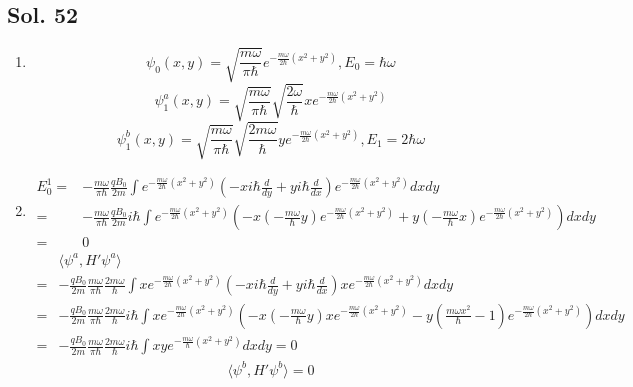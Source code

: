 \subsection*{Sol. 52}
\begin{enumerate}
    \item 
    $$
    \psi_0(x,y)=\sqrt{\frac{m\omega}{\pi\hbar}}e^{-\frac{m\omega}{2\hbar}(x^2+y^2)}, E_0 = \hbar\omega
    $$
    $$
    \psi^a_1(x,y)=
    \sqrt{\frac{m\omega}{\pi\hbar}}
    \sqrt{\frac{2\omega}{\hbar}}
    xe^{-\frac{m\omega}{2\hbar}(x^2+y^2)}
    $$
    $$
    \psi^b_1(x,y)=
    \sqrt{\frac{m\omega}{\pi\hbar}}
    \sqrt{\frac{2m\omega}{\hbar}}
    ye^{-\frac{m\omega}{2\hbar}(x^2+y^2)}, E_1 = 2\hbar\omega
    $$
    \item 
    \begin{align*}
        E^1_0 = &
        -\frac{m\omega}{\pi\hbar}\frac{qB_0}{2m}\int 
        e^{-\frac{m\omega}{2\hbar}(x^2+y^2)}
        (-xi\hbar\frac{d}{dy}+yi\hbar\frac{d}{dx})
        e^{-\frac{m\omega}{2\hbar}(x^2+y^2)}
        dxdy\\
        =&
        -\frac{m\omega}{\pi\hbar}\frac{qB_0}{2m}i\hbar 
        \int
        e^{-\frac{m\omega}{2\hbar}(x^2+y^2)}
        (-x(-\frac{m\omega}{\hbar}y)e^{-\frac{m\omega}{2\hbar}(x^2+y^2)}
        +y(-\frac{m\omega}{\hbar}x)e^{-\frac{m\omega}{2\hbar}(x^2+y^2)}
        )dxdy\\
        =&0
    \end{align*}
    \begin{align*}
        &\langle\psi^a, H'\psi^a\rangle\\
        =&
        -\frac{qB_0}{2m}
        \frac{m\omega}{\pi\hbar}\frac{2m\omega}{\hbar}\int 
        xe^{-\frac{m\omega}{2\hbar}(x^2+y^2)}
        (-xi\hbar\frac{d}{dy}+yi\hbar\frac{d}{dx})
        xe^{-\frac{m\omega}{2\hbar}(x^2+y^2)}dxdy\\
        =&
        -\frac{qB_0}{2m}
        \frac{m\omega}{\pi\hbar}\frac{2m\omega}{\hbar}
        i\hbar 
        \int x
        e^{-\frac{m\omega}{2\hbar}(x^2+y^2)}
        (-x(-\frac{m\omega}{\hbar}y)xe^{-\frac{m\omega}{2\hbar}(x^2+y^2)}
        -y(\frac{m\omega x^2}{\hbar}-1)e^{-\frac{m\omega}{2\hbar}(x^2+y^2)})dxdy\\
        =&
        -\frac{qB_0}{2m}
        \frac{m\omega}{\pi\hbar}\frac{2m\omega}{\hbar}
        i\hbar 
        \int xy
        e^{-\frac{m\omega}{\hbar}(x^2+y^2)}dxdy=0
    \end{align*}
    \begin{align*}
        \langle\psi^b, H'\psi^b\rangle=0

\end{align*}
\end{enumerate}

